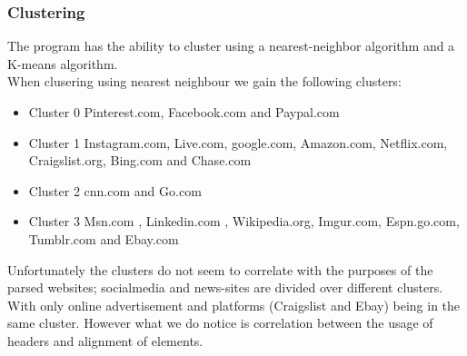 \subsubsection*{Clustering} 
The program has the ability to cluster using a nearest-neighbor algorithm and a K-means algorithm.
\\ When clusering using nearest neighbour we gain the following clusters:
\begin{itemize}
\item{Cluster 0} Pinterest.com, Facebook.com and Paypal.com
\item{Cluster 1} Instagram.com, Live.com, google.com, Amazon.com, Netflix.com, Craigslist.org, Bing.com and Chase.com
\item{Cluster 2} cnn.com and Go.com
\item{Cluster 3} Msn.com , Linkedin.com , Wikipedia.org, Imgur.com, Espn.go.com, Tumblr.com and Ebay.com
\end{itemize}
Unfortunately the clusters do not seem to correlate with the purposes of the parsed websites; socialmedia and news-sites are divided over different clusters. With only online advertisement and platforms (Craigslist and Ebay) being in the same cluster. However what we do notice is correlation between the usage of headers and alignment of elements.
